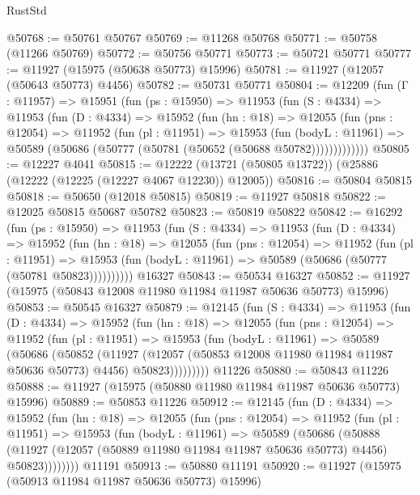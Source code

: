 \begin{lexlean}{RustStd}
\begin{coremodule}
@50768 := @50761 @50767
@50769 := @11268 @50768
@50771 := @50758 (@11266 @50769)
@50772 := @50756 @50771
@50773 := @50721 @50771
@50777 := @11927 (@15975 (@50638 @50773) @15996)
@50781 := @11927 (@12057 (@50643 @50773) @4456)
@50782 := @50731 @50771
@50804 := @12209
    (fun (Γ : @11957) =>
    @15951
      (fun (ps : @15950) =>
      @11953
        (fun (S : @4334) =>
        @11953
          (fun (D : @4334) =>
          @15952
            (fun (hn : @18) =>
            @12055
              (fun (pns : @12054) =>
              @11952
                (fun (pl : @11951) =>
                @15953
                  (fun (bodyL : @11961) =>
                  @50589 (@50686 (@50777 (@50781 (@50652 (@50688 @50782)))))))))))))
@50805 := @12227 @4041
@50815 := @12222 (@13721 (@50805 @13722)) (@25886 (@12222 (@12225 (@12227 @4067 @12230)) @12005))
@50816 := @50804 @50815
@50818 := @50650 (@12018 @50815)
@50819 := @11927 @50818
@50822 := @12025 @50815 @50687 @50782
@50823 := @50819 @50822
@50842 := @16292
    (fun (ps : @15950) =>
    @11953
      (fun (S : @4334) =>
      @11953
        (fun (D : @4334) =>
        @15952
          (fun (hn : @18) =>
          @12055
            (fun (pns : @12054) =>
            @11952
              (fun (pl : @11951) =>
              @15953 (fun (bodyL : @11961) => @50589 (@50686 (@50777 (@50781 @50823))))))))))
    @16327
@50843 := @50534 @16327
@50852 := @11927 (@15975 (@50843 @12008 @11980 @11984 @11987 @50636 @50773) @15996)
@50853 := @50545 @16327
@50879 := @12145
    (fun (S : @4334) =>
    @11953
      (fun (D : @4334) =>
      @15952
        (fun (hn : @18) =>
        @12055
          (fun (pns : @12054) =>
          @11952
            (fun (pl : @11951) =>
            @15953
              (fun (bodyL : @11961) =>
              @50589
                (@50686
                  (@50852
                    (@11927
                      (@12057 (@50853 @12008 @11980 @11984 @11987 @50636 @50773) @4456)
                      @50823)))))))))
    @11226
@50880 := @50843 @11226
@50888 := @11927 (@15975 (@50880 @11980 @11984 @11987 @50636 @50773) @15996)
@50889 := @50853 @11226
@50912 := @12145
    (fun (D : @4334) =>
    @15952
      (fun (hn : @18) =>
      @12055
        (fun (pns : @12054) =>
        @11952
          (fun (pl : @11951) =>
          @15953
            (fun (bodyL : @11961) =>
            @50589
              (@50686
                (@50888
                  (@11927 (@12057 (@50889 @11980 @11984 @11987 @50636 @50773) @4456) @50823))))))))
    @11191
@50913 := @50880 @11191
@50920 := @11927 (@15975 (@50913 @11984 @11987 @50636 @50773) @15996)

\end{coremodule}
\end{lexlean}
